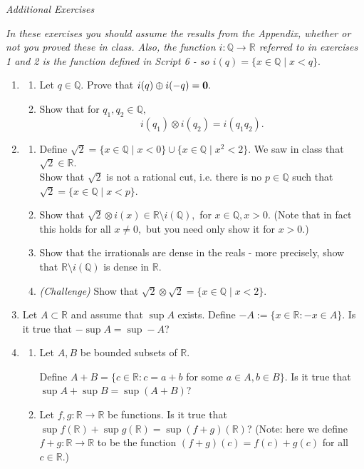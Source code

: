 \documentclass[11pt]{article}
\newcommand{\bbQ}{\mathbb{Q}}
\newcommand{\bbR}{\mathbb{R}}
\theoremstyle{definition}
\numberwithin{equation}{subsection}
\begin{document}
\begin{center}
{\em Additional Exercises}
\end{center}

{\em In these exercises you should assume the results from the Appendix, whether or not you proved these in class. Also, the function $i:\bbQ\to\bbR$ referred to in exercises 1 and 2 is the function defined in Script 6 - so $i(q)=\{x\in\bbQ\mid x<q\}.$}

\begin{enumerate}

\item
\begin{enumerate}
\item[a)] Let $q\in\bbQ.$
Prove that  $i(q) \oplus i(-q)=\bf{0.}$ 
\item[b)] Show that for $q_1,q_2\in \bbQ, $
 $$i(q_1)\otimes i(q_2)=i(q_1 q_2).$$

 \end{enumerate}







\item 
\begin{enumerate}
\item[a)] Define $\sqrt{2}=\{x\in\bbQ\mid x< 0\}\cup\{x\in \bbQ\mid x^2<2\}.$ We saw in class that $\sqrt{2}\in\bbR.$\\Show that
$\sqrt{2}$ is not a rational cut, i.e. there is no $p\in\bbQ$ such that $\sqrt{2}=\{x\in\bbQ\mid x<p\}.$
\item[b)] Show that $\sqrt{2} \otimes i(x)\in \bbR\setminus i(\bbQ),$ for $x\in\bbQ, x>0.$ (Note that in fact this holds for all $x\neq 0,$ but you need only show it for $x>0.$)
\item[c)] Show that the irrationals are dense in the reals - more precisely, show that $\bbR\setminus i(\bbQ) $ is dense in $\bbR.$
\item[d)] {\em (Challenge)} Show that $\sqrt{2}\otimes \sqrt{2}=\{x\in\bbQ\mid x<2\}.$ 
\end{enumerate}

\item Let $A \subset \bbR$ and assume that $\sup A$ exists.  Define $-A := \{ x \in \bbR : -x \in A\}$.  Is it true that $-\sup A = \sup -A$?

\item 
\begin{enumerate}
		\item Let $A,B$ be bounded subsets of $\bbR.$
		
			Define $A+B = \{c \in \bbR: c = a+b$ for some $a\in A, b\in B\}$.  Is it true that $\sup A + \sup B = \sup(A+B)$?
		\item Let $f,g: \bbR \to \bbR$ be functions.  Is it true that $\sup f(\bbR) + \sup g(\bbR)= \sup (f+g)(\bbR)$?  (Note: here we define $f+g:\bbR \to \bbR$ to be the function $(f+g)(c) = f(c) + g(c)$ for all $c\in \bbR$.)
	\end{enumerate}



\end{enumerate}
\end{document}
